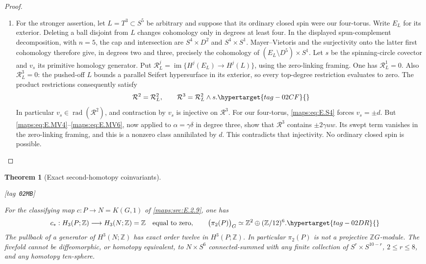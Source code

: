 \documentclass[11pt,a4paper]{article}
\numberwithin{equation}{section}
\newtheorem{theorem}{Theorem}[section]
\theoremstyle{definition}
\newcommand{\StatementRecord}[4]{{\upshape\footnotesize[tag~\texttt{#3}]}\enspace\ignorespaces}
\begin{document}
\begin{proof}
\begin{enumerate}[label=\arabic*.,leftmargin=*]
\item For the stronger assertion, let $L=T^3\subset S^5$ be arbitrary
and suppose that its ordinary closed spin were our four-torus.
Write $E_L$ for its exterior. Deleting a ball disjoint from
$L$ changes cohomology only in degrees at least four. In the
displayed spun-complement decomposition, with $n=5$, the cap
and intersection are $S^4\times D^2$ and $S^4\times S^1$.
Mayer--Vietoris and the surjectivity onto the latter first
cohomology therefore give, in degrees two and three, precisely
the cohomology of $(E_L\setminus D^5)\times S^1$.
Let $s$ be the spinning-circle covector and $v_s$ its primitive
homology generator. Put $\mathcal R_L^j=\operatorname{im}
\{H^j(E_L)\to H^j(L)\}$, using the zero-linking framing.
One has $\mathcal R_L^1=0$. Also $\mathcal R_L^3=0$:
the pushed-off $L$ bounds a parallel Seifert hypersurface in
its exterior, so every top-degree restriction evaluates to
zero. The product restrictions consequently satisfy
\begin{equation}
       \mathcal R^2=\mathcal R_L^2,\qquad
       \mathcal R^3=\mathcal R_L^2\wedge s.
 \hypertarget{tag-02CF}{}\label{maps:eq:E.S12}
\end{equation}
In particular $v_s\in\operatorname{rad}(\mathcal R^2)$,
and contraction by $v_s$ is injective on $\mathcal R^3$.
For our four-torus, \eqref{maps:eq:E.S4} forces $v_s=\pm d$.
But \eqref{maps:eq:E.MV4}--\eqref{maps:eq:E.MV6}, now applied to $\alpha=\gamma\delta$
in degree three, show that $\mathcal R^3$ contains
$\pm2\gamma uw$. Its swept term vanishes in the zero-linking
framing, and this is a nonzero class annihilated by $d$.
This contradicts that injectivity. No ordinary closed spin
is possible. 
\end{enumerate}
\end{proof}

\begin{theorem}[Exact second-homotopy coinvariants]\hypertarget{tag-02MB}{}\label{maps:src:E.2.11}
\StatementRecord{maps:src:E.2.11}{proved}{02MB}{\cref{maps:src:E.2.9}, \cref{maps:src:E.2.6}, \eqref{maps:eq:E.S7}, \eqref{maps:eq:E.MV7}, \eqref{maps:eq:E.MV8}, \eqref{maps:eq:E.MV6}, \eqref{maps:eq:E.MV4}, \eqref{maps:eq:E.S9}, \eqref{maps:eq:E.S10}, \eqref{maps:eq:E.S11}}


For the classifying map $c:P\to N=K(G,1)$ of \ref{maps:src:E.2.9}, one has
\begin{equation}
 c_*:H_3(P;\mathbb Z)\longrightarrow H_3(N;\mathbb Z)=\mathbb Z
       \quad\text{equal to zero},
 \qquad
 \bigl(\pi_2(P)\bigr)_G
       \simeq\mathbb Z^2\oplus(\mathbb Z/12)^6.
 \hypertarget{tag-02DR}{}\label{maps:eq:E.S6}
\end{equation}
The pullback of a generator of $H^3(N;\mathbb Z)$ has exact order
twelve in $H^3(P;\mathbb Z)$. In particular $\pi_2(P)$ is not a
projective $\mathbb ZG$-module. The fivefold cannot be diffeomorphic,
or homotopy equivalent, to $N\times S^6$ connected-summed with any
finite collection of $S^r\times S^{10-r}$, $2\leq r\leq8$, and
any homotopy ten-sphere. \end{theorem}
\end{document}
